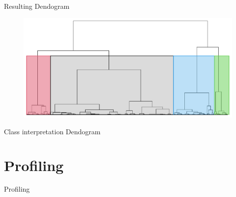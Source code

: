 \begin{frame}{Resulting Dendogram}
\begin{figure}[H]
    \centering
    \includegraphics[width=0.8\linewidth]{cluster-dendo-h3-color}
    \label{fig:dendogram-final}
\end{figure}
\end{frame}


\begin{frame}{Class interpretation Dendogram}
\end{frame}

\section{Profiling}
\begin{frame}[allowframebreaks]{Profiling}

\begin{columns}
\begin{column}{0.5\textwidth}
\end{column}
\begin{column}{0.5\textwidth}  %
\end{column}
\end{columns}

\framebreak

\begin{columns}
\begin{column}{0.5\textwidth}
\end{column}
\begin{column}{0.5\textwidth}  %
\end{column}
\end{columns}
\end{frame}

